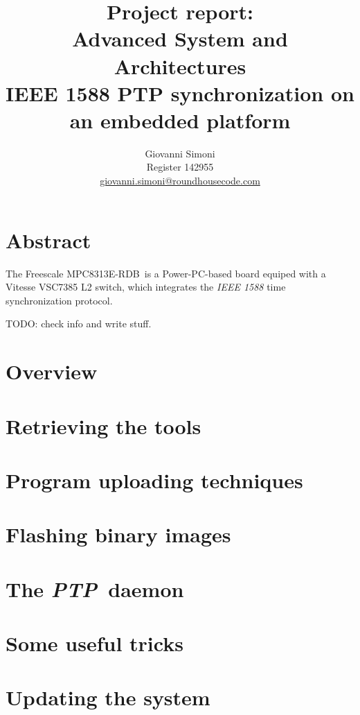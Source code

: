 \documentclass[10pt,a4paper]{article}
\title {
    Project report:\\
    Advanced System and Architectures\\
    IEEE 1588 PTP synchronization on an embedded platform
}
\author{
    Giovanni Simoni\\
    Register 142955\\
    \href{mailto:giovanni.simoni@roundhousecode.com}
         {giovanni.simoni@roundhousecode.com}
}
\newcommand{\TechName}[1]{\textsf{{#1}}}
\newcommand{\StdName}[1]{\emph{{#1}}}
\newcommand{\MyBoard}{\TechName{Freescale MPC8313E-RDB}}
\newcommand{\PPC}{\TechName{Power-PC}}
\newcommand{\PTP}{\StdName{PTP}}
\begin{document}
\maketitle

    \section*{ \center Abstract }

        The \MyBoard\ is a \PPC-based board equiped with a
        \TechName{Vitesse VSC7385 L2 switch}, which integrates the
        \StdName{IEEE 1588} time synchronization protocol.

        TODO: check info and write stuff.

    \tableofcontents
    \newpage

    \section{ Overview } \label{sec:Overview}
    

    \section{ Retrieving the tools } \label{sec:GetTools}
    

    \section{ Program uploading techniques } \label{sec:Upload}
    

    \section{ Flashing binary images } \label{sec:FlashBinary}
    

    \section{ The \PTP\ daemon } \label{sec:PTPd}

    \section{ Some useful tricks } \label{sec:Tricks}
    

    \section{ Updating the system } \label{sec:Update}
\end{document}
